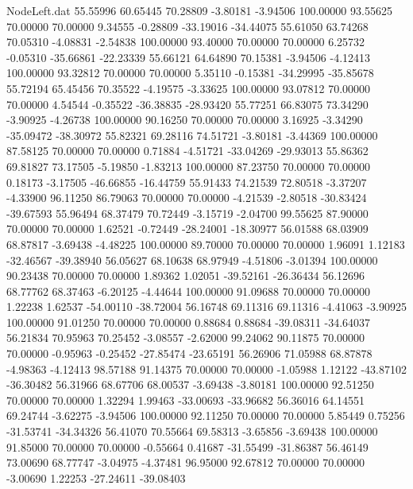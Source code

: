 \begin{filecontents}{NodeLeft.dat}
  55.55996   60.65445   70.28809    -3.80181   -3.94506  100.00000   93.55625   70.00000   70.00000    9.34555   -0.28809  -33.19016  -34.44075
  55.61050   63.74268   70.05310    -4.08831   -2.54838  100.00000   93.40000   70.00000   70.00000    6.25732   -0.05310  -35.66861  -22.23339
  55.66121   64.64890   70.15381    -3.94506   -4.12413  100.00000   93.32812   70.00000   70.00000    5.35110   -0.15381  -34.29995  -35.85678
  55.72194   65.45456   70.35522    -4.19575   -3.33625  100.00000   93.07812   70.00000   70.00000    4.54544   -0.35522  -36.38835  -28.93420
  55.77251   66.83075   73.34290    -3.90925   -4.26738  100.00000   90.16250   70.00000   70.00000    3.16925   -3.34290  -35.09472  -38.30972
  55.82321   69.28116   74.51721    -3.80181   -3.44369  100.00000   87.58125   70.00000   70.00000    0.71884   -4.51721  -33.04269  -29.93013
  55.86362   69.81827   73.17505    -5.19850   -1.83213  100.00000   87.23750   70.00000   70.00000    0.18173   -3.17505  -46.66855  -16.44759
  55.91433   74.21539   72.80518    -3.37207   -4.33900   96.11250   86.79063   70.00000   70.00000   -4.21539   -2.80518  -30.83424  -39.67593
  55.96494   68.37479   70.72449    -3.15719   -2.04700   99.55625   87.90000   70.00000   70.00000    1.62521   -0.72449  -28.24001  -18.30977
  56.01588   68.03909   68.87817    -3.69438   -4.48225  100.00000   89.70000   70.00000   70.00000    1.96091    1.12183  -32.46567  -39.38940
  56.05627   68.10638   68.97949    -4.51806   -3.01394  100.00000   90.23438   70.00000   70.00000    1.89362    1.02051  -39.52161  -26.36434
  56.12696   68.77762   68.37463    -6.20125   -4.44644  100.00000   91.09688   70.00000   70.00000    1.22238    1.62537  -54.00110  -38.72004
  56.16748   69.11316   69.11316    -4.41063   -3.90925  100.00000   91.01250   70.00000   70.00000    0.88684    0.88684  -39.08311  -34.64037
  56.21834   70.95963   70.25452    -3.08557   -2.62000   99.24062   90.11875   70.00000   70.00000   -0.95963   -0.25452  -27.85474  -23.65191
  56.26906   71.05988   68.87878    -4.98363   -4.12413   98.57188   91.14375   70.00000   70.00000   -1.05988    1.12122  -43.87102  -36.30482
  56.31966   68.67706   68.00537    -3.69438   -3.80181  100.00000   92.51250   70.00000   70.00000    1.32294    1.99463  -33.00693  -33.96682
  56.36016   64.14551   69.24744    -3.62275   -3.94506  100.00000   92.11250   70.00000   70.00000    5.85449    0.75256  -31.53741  -34.34326
  56.41070   70.55664   69.58313    -3.65856   -3.69438  100.00000   91.85000   70.00000   70.00000   -0.55664    0.41687  -31.55499  -31.86387
  56.46149   73.00690   68.77747    -3.04975   -4.37481   96.95000   92.67812   70.00000   70.00000   -3.00690    1.22253  -27.24611  -39.08403

\end{filecontents}
